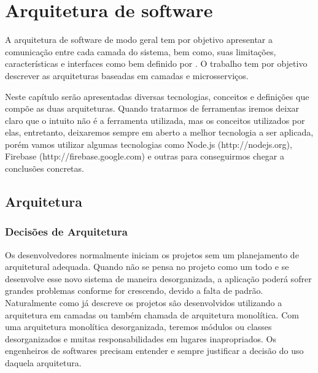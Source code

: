
\chapter{Arquitetura de software}\label{cap2}

A arquitetura de software de modo geral tem por objetivo apresentar a comunicação entre cada camada do sistema, bem como, suas limitações, características e interfaces como bem definido por \cite{Sizo2010}. O trabalho tem por objetivo descrever as arquiteturas baseadas em camadas e microsserviços.

Neste capítulo serão apresentadas diversas tecnologias, conceitos e definições que compõe as duas arquiteturas. Quando tratarmos de ferramentas iremos deixar claro que o intuito não é a ferramenta utilizada, mas os conceitos utilizados por elas, entretanto, deixaremos sempre em aberto a melhor tecnologia a ser aplicada, porém vamos utilizar algumas tecnologias como Node.js (http://nodejs.org), Firebase (http://firebase.google.com) e outras para conseguirmos chegar a conclusões concretas.

\section{Arquitetura}

\subsection{Decisões de Arquitetura}

Os desenvolvedores normalmente iniciam os projetos sem um planejamento de arquitetural adequada. Quando não se pensa no projeto como um todo e se desenvolve esse novo sistema de maneira desorganizada, a aplicação poderá sofrer grandes problemas conforme for crescendo, devido a falta de padrão. Naturalmente como já descreve  \cite{Richards2015} os projetos são desenvolvidos utilizando a arquitetura em camadas ou também chamada de arquitetura monolítica. Com uma arquitetura monolítica desorganizada, teremos módulos ou classes desorganizados e muitas responsabilidades em lugares inapropriados. Os engenheiros de softwares precisam entender e sempre justificar a decisão do uso daquela arquitetura.

